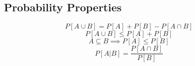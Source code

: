\subsection{Probability Properties}
\begin{equation}
    P\left[A \cup B\right] = P\left[A\right] + P\left[B\right] - P\left[A \cap B\right]
\end{equation}
\begin{equation}
    P\left[A \cup B\right] \leq P\left[A\right] + P\left[B\right]
\end{equation}
\begin{equation}
    A \subseteq B \implies P\left[A\right] \leq P\left[B\right]
\end{equation}
\begin{equation}
    P\left[A | B\right] = \frac{P[A \cap B]}{P[B]}
\end{equation}
